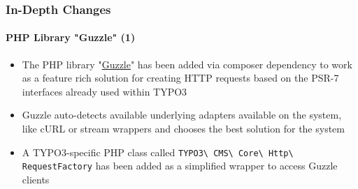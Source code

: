 \begin{frame}[fragile]
	\frametitle{In-Depth Changes}
	\framesubtitle{PHP Library "Guzzle" (1)}

	\begin{itemize}

		\item The PHP library
			"\href{http://docs.guzzlephp.org}{Guzzle}"
			has been added via composer dependency to work as a feature rich
			solution for creating HTTP requests based on the PSR-7 interfaces
			already used within TYPO3

		\item Guzzle auto-detects available underlying adapters available on
			the system, like cURL or stream wrappers and chooses the best
			solution for the system

		\item A TYPO3-specific PHP class called
			\texttt{TYPO3\textbackslash
				CMS\textbackslash
				Core\textbackslash
				Http\textbackslash
				RequestFactory}\newline
			has been added as a simplified wrapper to access Guzzle clients

	\end{itemize}

\end{frame}


